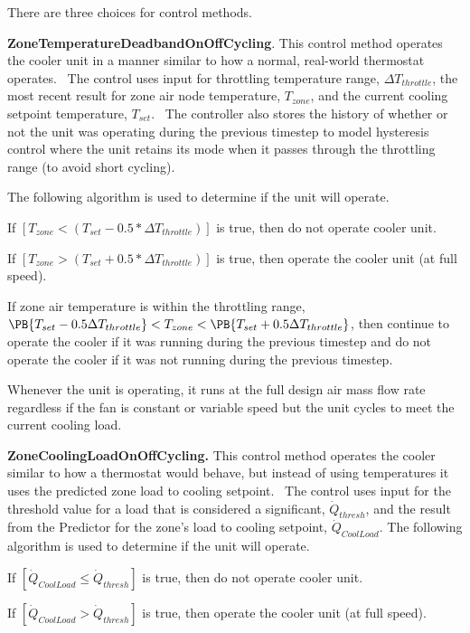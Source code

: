 There are three choices for control methods.

\textbf{ZoneTemperatureDeadbandOnOffCycling}. This control method operates the cooler unit in a manner similar to how a normal, real-world thermostat operates.~ The control uses input for throttling temperature range, \(\Delta {T_{throttle}}\), the most recent result for zone air node temperature, \({T_{zone}}\), and the current cooling setpoint temperature, \({T_{set}}\).~ The controller also stores the history of whether or not the unit was operating during the previous timestep to model hysteresis control where the unit retains its mode when it passes through the throttling range (to avoid short cycling).

The following algorithm is used to determine if the unit will operate.

If \(\left[ {{T_{zone}} < \left( {{T_{set}} - 0.5*\Delta {T_{throttle}}} \right)} \right]\) is true, then do not operate cooler unit.

If \(\left[ {{T_{zone}} > \left( {{T_{set}} + 0.5*\Delta {T_{throttle}}} \right)} \right]\) is true, then operate the cooler unit (at full speed).

If zone air temperature is within the throttling range, $\PB{T_{set}-0.5\Delta T_{throttle}} < T_{zone} < \PB{T_{set}+0.5\Delta T_{throttle}}$, then continue to operate the cooler if it was running during the previous timestep and do not operate the cooler if it was not running during the previous timestep.

Whenever the unit is operating, it runs at the full design air mass flow rate regardless if the fan is constant or variable speed but the unit cycles to meet the current cooling load.

\textbf{ZoneCoolingLoadOnOffCycling.} This control method operates the cooler similar to how a thermostat would behave, but instead of using temperatures it uses the predicted zone load to cooling setpoint.~ The control uses input for the threshold value for a load that is considered a significant, \({\dot Q_{thresh}}\), and the result from the Predictor for the zone's load to cooling setpoint, \({\dot Q_{CoolLoad}}\). The following algorithm is used to determine if the unit will operate.

If \(\left[ {{{\dot Q}_{CoolLoad}} \le {{\dot Q}_{thresh}}} \right]\) is true, then do not operate cooler unit.

If \(\left[ {{{\dot Q}_{CoolLoad}} > {{\dot Q}_{thresh}}} \right]\) is true, then operate the cooler unit (at full speed).

